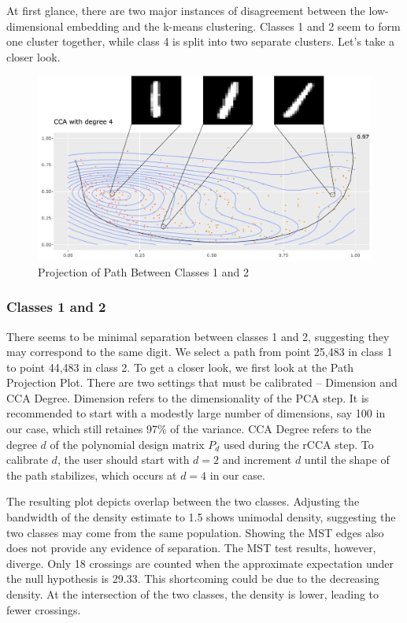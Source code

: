 \documentclass{article}
\begin{document}
At first glance, there are two major instances of disagreement between the low-dimensional embedding and the k-means clustering. Classes 1 and 2 seem to form one cluster together, while class 4 is split into two separate clusters. Let's take a closer look.

\renewcommand{\figurename}{Figure}
\renewcommand{\thefigure}{3}
\begin{figure}[!b]
\centering
\includegraphics[scale=0.4]{class 1+2 projection}
\caption{Projection of Path Between Classes 1 and 2}
\end{figure}

\subsubsection{Classes 1 and 2}
There seems to be minimal separation between classes 1 and 2, suggesting they may correspond to the same digit. We select a path from point 25,483 in class 1 to point 44,483 in class 2. To get a closer look, we first look at the Path Projection Plot. There are two settings that must be calibrated -- Dimension and CCA Degree. Dimension refers to the dimensionality of the PCA step. It is recommended to start with a modestly large number of dimensions, say 100 in our case, which still retaines 97\% of the variance. CCA Degree refers to the degree $d$ of the polynomial design matrix $P_d$ used during the rCCA step. To calibrate $d$, the user should start with $d = 2$ and increment $d$ until the shape of the path stabilizes, which occurs at $d = 4$ in our case.

The resulting plot depicts overlap between the two classes. Adjusting the bandwidth of the density estimate to 1.5 shows unimodal density, suggesting the two classes may come from the same population. Showing the MST edges also does not provide any evidence of separation. The MST test results, however, diverge. Only 18 crossings are counted when the approximate expectation under the null hypothesis is 29.33. This shortcoming could be due to the decreasing density. At the intersection of the two classes, the density is lower, leading to fewer crossings.
\end{document}
